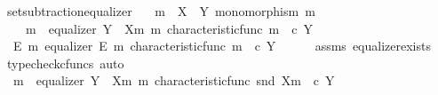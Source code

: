\begin{isabellebody}
\isanewline
{}\isamarkupfalse%
\ set{\isacharunderscore}{\kern0pt}subtraction{\isacharunderscore}{\kern0pt}equalizer{\isacharcolon}{\kern0pt}\isanewline
\ \ \ {\isachardoublequoteopen}m\ {\isacharcolon}{\kern0pt}\ X\ {\isasymrightarrow}\ Y{\isachardoublequoteclose}\ {\isachardoublequoteopen}monomorphism\ m{\isachardoublequoteclose}\isanewline
\ \ \ {\isachardoublequoteopen}{\isasymexists}\ m{\isacharprime}{\kern0pt}{\isachardot}{\kern0pt}\ \ equalizer\ {\isacharparenleft}{\kern0pt}Y\ {\isasymsetminus}\ {\isacharparenleft}{\kern0pt}X{\isacharcomma}{\kern0pt}m{\isacharparenright}{\kern0pt}{\isacharparenright}{\kern0pt}\ m{\isacharprime}{\kern0pt}\ {\isacharparenleft}{\kern0pt}characteristic{\isacharunderscore}{\kern0pt}func\ m{\isacharparenright}{\kern0pt}\ {\isacharparenleft}{\kern0pt}{\isasymf}\ {\isasymcirc}\isactrlsub c\ {\isasymbeta}\isactrlbsub Y\isactrlesub {\isacharparenright}{\kern0pt}{\isachardoublequoteclose}\isanewline
%
\isadelimproof
%
\endisadelimproof
%
\isatagproof
{}\isamarkupfalse%
\ {\isacharminus}{\kern0pt}\isanewline
\ \ \isamarkupfalse%
\ {\isachardoublequoteopen}{\isasymexists}\ E\ m{\isacharprime}{\kern0pt}{\isachardot}{\kern0pt}\ equalizer\ E\ m{\isacharprime}{\kern0pt}\ {\isacharparenleft}{\kern0pt}characteristic{\isacharunderscore}{\kern0pt}func\ m{\isacharparenright}{\kern0pt}\ {\isacharparenleft}{\kern0pt}{\isasymf}\ {\isasymcirc}\isactrlsub c\ {\isasymbeta}\isactrlbsub Y\isactrlesub {\isacharparenright}{\kern0pt}{\isachardoublequoteclose}\isanewline
\ \ \ \ \isamarkupfalse%
\ assms\ equalizer{\isacharunderscore}{\kern0pt}exists\ \isamarkupfalse%
\ {\isacharparenleft}{\kern0pt}typecheck{\isacharunderscore}{\kern0pt}cfuncs{\isacharcomma}{\kern0pt}\ auto{\isacharparenright}{\kern0pt}\isanewline
\ \ \isamarkupfalse%
\ \isamarkupfalse%
\ {\isachardoublequoteopen}{\isasymexists}\ m{\isacharprime}{\kern0pt}{\isachardot}{\kern0pt}\ \ equalizer\ {\isacharparenleft}{\kern0pt}Y\ {\isasymsetminus}\ {\isacharparenleft}{\kern0pt}X{\isacharcomma}{\kern0pt}m{\isacharparenright}{\kern0pt}{\isacharparenright}{\kern0pt}\ m{\isacharprime}{\kern0pt}\ {\isacharparenleft}{\kern0pt}characteristic{\isacharunderscore}{\kern0pt}func\ {\isacharparenleft}{\kern0pt}snd\ {\isacharparenleft}{\kern0pt}X{\isacharcomma}{\kern0pt}m{\isacharparenright}{\kern0pt}{\isacharparenright}{\kern0pt}{\isacharparenright}{\kern0pt}\ {\isacharparenleft}{\kern0pt}{\isasymf}\ {\isasymcirc}\isactrlsub c\ {\isasymbeta}\isactrlbsub Y\isactrlesub {\isacharparenright}{\kern0pt}{\isachardoublequoteclose}\isanewline

\end{isabellebody}
